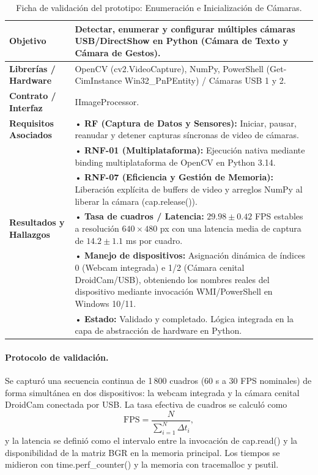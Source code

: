 \begin{table}[H]
    \centering
    \caption{Ficha de validación del prototipo: Enumeración e Inicialización de Cámaras.}
    \label{tab:ficha_camaras}
    \begin{tabular}{|L{3.2cm}|L{11.0cm}|}
        \hline
        \textbf{Objetivo} & Detectar, enumerar y configurar múltiples cámaras USB/DirectShow en Python (Cámara de Texto y Cámara de Gestos). \\ \hline
        \textbf{Librerías / Hardware} & OpenCV (cv2.VideoCapture), NumPy, PowerShell (Get-CimInstance Win32\_PnPEntity) / Cámaras USB 1 y 2. \\ \hline
        \textbf{Contrato / Interfaz} & IImageProcessor. \\ \hline
        \textbf{Requisitos Asociados} &
        • \textbf{RF (Captura de Datos y Sensores):} Iniciar, pausar, reanudar y detener capturas síncronas de video de cámaras. \vspace{0.1cm} \\
        & • \textbf{RNF-01 (Multiplataforma):} Ejecución nativa mediante binding multiplataforma de OpenCV en Python 3.14. \vspace{0.1cm} \\
        & • \textbf{RNF-07 (Eficiencia y Gestión de Memoria):} Liberación explícita de buffers de video y arreglos NumPy al liberar la cámara (cap.release()). \\ \hline
        \textbf{Resultados y Hallazgos} &
        • \textbf{Tasa de cuadros / Latencia:} $29.98 \pm 0.42$ FPS estables a resolución $640\times480$ px con una latencia media de captura de $14.2 \pm 1.1$ ms por cuadro. \vspace{0.1cm} \\
        & • \textbf{Manejo de dispositivos:} Asignación dinámica de índices 0 (Webcam integrada) e 1/2 (Cámara cenital DroidCam/USB), obteniendo los nombres reales del dispositivo mediante invocación WMI/PowerShell en Windows 10/11. \vspace{0.1cm} \\
        & • \textbf{Estado:} Validado y completado. Lógica integrada en la capa de abstracción de hardware en Python. \\ \hline
    \end{tabular}
\end{table}
 
\paragraph{Protocolo de validación.} Se capturó una secuencia continua de 1\,800 cuadros (60 s a 30 FPS nominales) de forma simultánea en dos dispositivos: la webcam integrada y la cámara cenital DroidCam conectada por USB. La tasa efectiva de cuadros se calculó como
\[ \mathrm{FPS} = \frac{N}{\sum_{i=1}^{N} \Delta t_i}, \]
y la latencia se definió como el intervalo entre la invocación de cap.read() y la disponibilidad de la matriz BGR en la memoria principal. Los tiempos se midieron con time.perf\_counter() y la memoria con tracemalloc y psutil.
 
